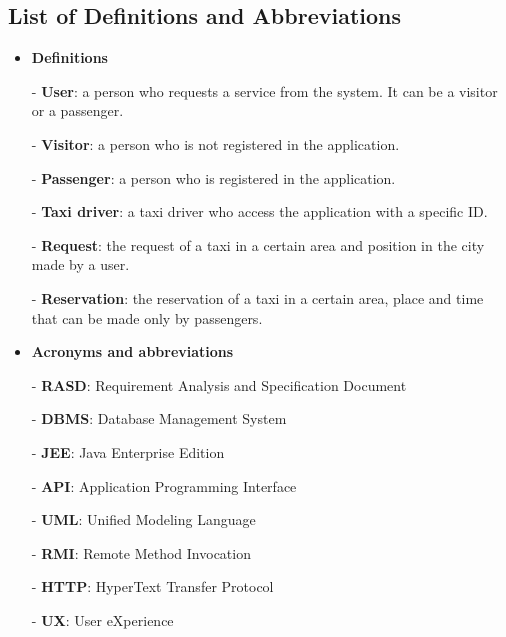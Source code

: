 \documentclass[18pt,oneside,a4paper, titlepage]{article}
\begin{document}
	\subsection{List of	Definitions	and	Abbreviations}
		\begin{itemize}
			\item \textbf{Definitions}
			\item[-] \textbf{User}: a person who requests a service from the system. It can be a visitor or a passenger.
			\item[-] \textbf{Visitor}: a person who is not registered in the application.
			\item[-] \textbf{Passenger}: a person who is registered in the application.
			\item[-] \textbf{Taxi driver}: a taxi driver who access the application with a specific ID.
			\item[-] \textbf{Request}: the request of a taxi in a certain area and position in the city made by a user.
			\item[-] \textbf{Reservation}: the reservation of a taxi in a certain area, place and time that can be made only by passengers.
			
			\item \textbf{Acronyms and abbreviations}
			\item[-] \textbf{RASD}: Requirement Analysis and Specification Document
			\item[-] \textbf{DBMS}: Database Management System
			\item[-] \textbf{JEE}: Java Enterprise Edition
			\item[-] \textbf{API}: Application Programming Interface
			\item[-] \textbf{UML}: Unified Modeling Language
			\item[-] \textbf{RMI}: Remote Method Invocation
			\item[-] \textbf{HTTP}: HyperText Transfer Protocol
			\item[-] \textbf{UX}: User eXperience
			
		\end{itemize}
\end{document}
